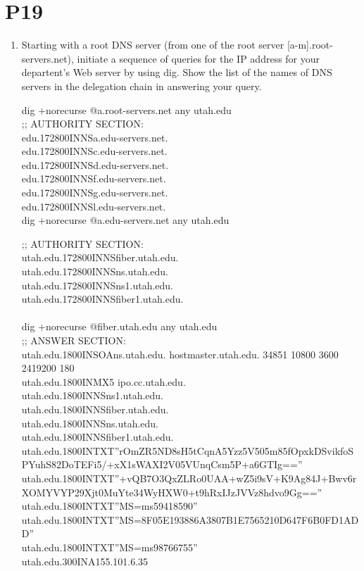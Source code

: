 \documentclass[11pt]{article}
\begin{document}
\section*{P19}
\begin{enumerate}[label=(\alph*)]
\item Starting with a root DNS server (from one of the root server [a-m].root-servers.net), initiate a sequence of queries for the IP address for your departent's Web server by using dig. Show the list of the names of DNS servers in the delegation chain in answering your query.

dig +norecurse @a.root-servers.net any utah.edu\\

;; AUTHORITY SECTION:\\
  edu.172800INNSa.edu-servers.net.\\
  edu.172800INNSc.edu-servers.net.\\
  edu.172800INNSd.edu-servers.net.\\
  edu.172800INNSf.edu-servers.net.\\
  edu.172800INNSg.edu-servers.net.\\
  edu.172800INNSl.edu-servers.net.\\


dig +norecurse @a.edu-servers.net any utah.edu

;; AUTHORITY SECTION:\\
  utah.edu.172800INNSfiber.utah.edu.\\
  utah.edu.172800INNSns.utah.edu.\\
  utah.edu.172800INNSns1.utah.edu.\\
  utah.edu.172800INNSfiber1.utah.edu.\\\\

dig +norecurse @fiber.utah.edu any utah.edu\\

;; ANSWER SECTION:\\
  utah.edu.1800INSOAns.utah.edu. hostmaster.utah.edu. 34851 10800 3600 2419200 180\\
  utah.edu.1800INMX5 ipo.cc.utah.edu.\\
  utah.edu.1800INNSns1.utah.edu.\\
  utah.edu.1800INNSfiber.utah.edu.\\
  utah.edu.1800INNSns.utah.edu.\\
  utah.edu.1800INNSfiber1.utah.edu.\\
  utah.edu.1800INTXT''rOmZR5ND8sH5tCqnA5Yzz5V505m85fOpxkDSvikfoSPYuhS82DoTEFi5/+xX1sWAXI2V05VUnqCsm5P+a6GTIg==''\\
  utah.edu.1800INTXT''+vQB7O3QxZLRo0UAA+wZ5i9sV+K9Ag84J+Bwv6rXOMYVYP29Xjt0MuYte34WyHXW0+t9hRxIJzJVVz8hdvo9Gg==''\\
  utah.edu.1800INTXT''MS=ms59418590''\\
  utah.edu.1800INTXT''MS=8F05E193886A3807B1E7565210D647F6B0FD1ADD''\\
  utah.edu.1800INTXT''MS=ms98766755''\\
  utah.edu.300INA155.101.6.35\\\\




\end{enumerate}
\end{document}
